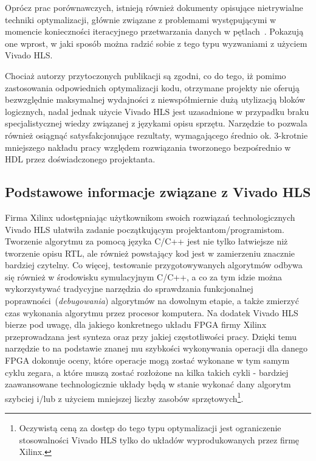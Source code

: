 Oprócz prac porównawczych, istnieją również dokumenty opisujące nietrywialne techniki optymalizacji, głównie związane z problemami występującymi w momencie konieczności iteracyjnego przetwarzania danych w pętlach~\cite{LOOP_PARALLELIZATION}\cite{HLS_HDL_MATRIX}. Pokazują one wprost, w jaki sposób można radzić sobie z tego typu wyzwaniami z użyciem Vivado HLS.

Chociaż autorzy przytoczonych publikacji są zgodni, co do tego, iż pomimo zastosowania odpowiednich optymalizacji kodu, otrzymane projekty nie oferują bezwzględnie maksymalnej wydajności z niewspółmiernie dużą utylizacją bloków logicznych, nadal jednak użycie Vivado HLS jest uzasadnione w przypadku braku specjalistycznej wiedzy związanej z językami opisu sprzętu. Narzędzie to pozwala również osiągnąć satysfakcjonujące rezultaty, wymagającego średnio ok. 3-krotnie mniejszego nakładu pracy względem rozwiązania tworzonego bezpośrednio w HDL przez doświadczonego projektanta.

\subsection{Podstawowe informacje związane z Vivado HLS}
Firma Xilinx udostępniając użytkownikom swoich rozwiązań technologicznych Vivado HLS ułatwiła zadanie początkującym projektantom/programistom. Tworzenie algorytmu za pomocą języka C/C++ jest nie tylko łatwiejsze niż tworzenie opisu RTL, ale również powstający kod jest w zamierzeniu znacznie bardziej czytelny. Co więcej, testowanie przygotowywanych algorytmów odbywa się również w środowisku symulacyjnym C/C++, a co za tym idzie można wykorzystywać tradycyjne narzędzia do sprawdzania funkcjonalnej poprawności~(\textit{debugowania}) algorytmów na dowolnym etapie, a także zmierzyć czas wykonania algorytmu przez procesor komputera. Na dodatek Vivado HLS bierze pod uwagę, dla jakiego konkretnego układu FPGA firmy Xilinx przeprowadzana jest synteza oraz przy jakiej częstotliwości pracy. Dzięki temu narzędzie to na podstawie znanej mu szybkości wykonywania operacji dla danego FPGA dokonuje oceny, które operacje mogą zostać wykonane w tym samym cyklu zegara, a które muszą zostać rozłożone na kilka takich cykli - bardziej zaawansowane technologicznie układy będą w stanie wykonać dany algorytm szybciej i/lub z użyciem mniejszej liczby zasobów sprzętowych\footnote{Oczywistą ceną za dostęp do tego typu optymalizacji jest ograniczenie stosowalności Vivado HLS tylko do układów wyprodukowanych przez firmę Xilinx.}.

